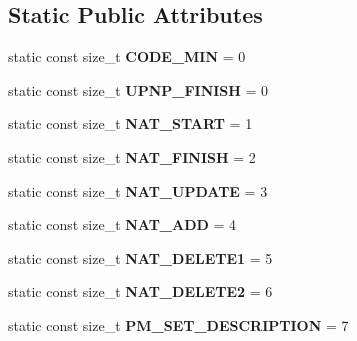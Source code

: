 \subsection*{Static Public Attributes}
\begin{DoxyCompactItemize}
\item 
\hypertarget{classcl_u_pn_p_thread_acbebbcdd6440bc8a75312d27d56d1985}{
static const size\_\-t {\bfseries CODE\_\-MIN} = 0}
\label{classcl_u_pn_p_thread_acbebbcdd6440bc8a75312d27d56d1985}

\item 
\hypertarget{classcl_u_pn_p_thread_a7f074ffd6f794fa6b37ea95bbeee129e}{
static const size\_\-t {\bfseries UPNP\_\-FINISH} = 0}
\label{classcl_u_pn_p_thread_a7f074ffd6f794fa6b37ea95bbeee129e}

\item 
\hypertarget{classcl_u_pn_p_thread_a3254ae03e59702164258e82f88938ff0}{
static const size\_\-t {\bfseries NAT\_\-START} = 1}
\label{classcl_u_pn_p_thread_a3254ae03e59702164258e82f88938ff0}

\item 
\hypertarget{classcl_u_pn_p_thread_a5b84953b0b9b4234a641ae00fa843f1e}{
static const size\_\-t {\bfseries NAT\_\-FINISH} = 2}
\label{classcl_u_pn_p_thread_a5b84953b0b9b4234a641ae00fa843f1e}

\item 
\hypertarget{classcl_u_pn_p_thread_a1b7c5c0d48ebb74be7f8d5c5cf472c79}{
static const size\_\-t {\bfseries NAT\_\-UPDATE} = 3}
\label{classcl_u_pn_p_thread_a1b7c5c0d48ebb74be7f8d5c5cf472c79}

\item 
\hypertarget{classcl_u_pn_p_thread_a351ed94d7142d4e3806c3a92349c39eb}{
static const size\_\-t {\bfseries NAT\_\-ADD} = 4}
\label{classcl_u_pn_p_thread_a351ed94d7142d4e3806c3a92349c39eb}

\item 
\hypertarget{classcl_u_pn_p_thread_ae2997c67867ce3a5d86e2603f4741ec6}{
static const size\_\-t {\bfseries NAT\_\-DELETE1} = 5}
\label{classcl_u_pn_p_thread_ae2997c67867ce3a5d86e2603f4741ec6}

\item 
\hypertarget{classcl_u_pn_p_thread_ab506bdd29dc508f4bd4a5adc7f0f4c79}{
static const size\_\-t {\bfseries NAT\_\-DELETE2} = 6}
\label{classcl_u_pn_p_thread_ab506bdd29dc508f4bd4a5adc7f0f4c79}

\item 
\hypertarget{classcl_u_pn_p_thread_a5edbe701698fd5432942c56e1df0a79b}{
static const size\_\-t {\bfseries PM\_\-SET\_\-DESCRIPTION} = 7}
\label{classcl_u_pn_p_thread_a5edbe701698fd5432942c56e1df0a79b}


\end{DoxyCompactItemize}
